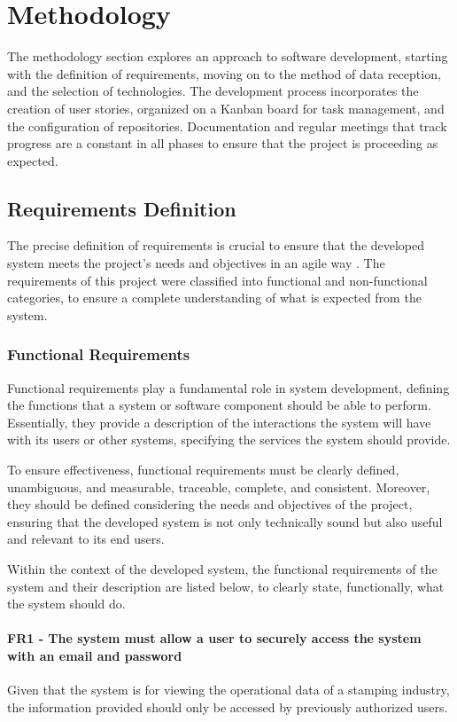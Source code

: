 \chapter{Methodology}\label{cap:metodology}
The methodology section explores an approach to software development, starting with the definition of requirements, moving on to the method of data reception, and the selection of technologies. The development process incorporates the creation of user stories, organized on a Kanban board for task management, and the configuration of repositories. Documentation and regular meetings that track progress are a constant in all phases to ensure that the project is proceeding as expected.

\section[Requirements Definition]{Requirements Definition}\label{sec:req}The precise definition of requirements is crucial to ensure that the developed system meets the project's needs and objectives in an agile way \cite{asghar2016role}. The requirements of this project were classified into functional and non-functional categories, to ensure a complete understanding of what is expected from the system.

\subsection[Functional Requirements]{Functional Requirements}
Functional requirements play a fundamental role in system development, defining the functions that a system or software component should be able to perform. Essentially, they provide a description of the interactions the system will have with its users or other systems, specifying the services the system should provide.

To ensure effectiveness, functional requirements must be clearly defined, unambiguous, and measurable, traceable, complete, and consistent. Moreover, they should be defined considering the needs and objectives of the project, ensuring that the developed system is not only technically sound but also useful and relevant to its end users.

Within the context of the developed system, the functional requirements of the system and their description are listed below, to clearly state, functionally, what the system should do.

\subsubsection{FR1 - The system must allow a user to securely access the system with an email and password}Given that the system is for viewing the operational data of a stamping industry, the information provided should only be accessed by previously authorized users.

